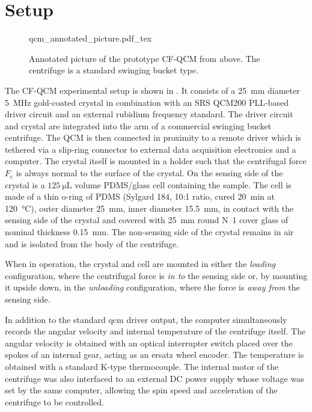 \section{Setup}
\begin{figure}[ht]
  \centering
  {qcm_annotated_picture.pdf_tex}
  \caption{Annotated picture of the prototype CF-QCM from above.  The
    centrifuge is a standard swinging bucket type.}
  \label{fig:cfqcmexpsetup}
\end{figure}

The CF-QCM experimental setup is shown in .  It
consists of a \SI{25}{\milli\meter} diameter \SI{5}{\mega\hertz} gold-coated
crystal in combination with an SRS QCM200 PLL-based driver circuit and an
external rubidium frequency standard.  The driver circuit and crystal are
integrated into the arm of a commercial swinging bucket centrifuge.  The QCM
is then connected in proximity to a remote driver which is tethered via
a slip-ring connector to external data acquisition electronics and a computer.
The crystal itself is mounted in a holder such that the centrifugal force
$F_\mathrm{c}$ is always normal to the surface of the crystal.  On the sensing
side of the crystal is a $\SI{125}{\micro\liter}$ volume PDMS/glass cell
containing the sample.  The cell is made of a thin o-ring of PDMS (Sylgard
184, 10:1 ratio, cured \SI{20}{\minute} at \SI{120}{\celsius}), outer diameter
\SI{25}{\milli\meter}, inner diameter \SI{15.5}{\milli\meter}, in contact with
the sensing side of the crystal and covered with \SI{25}{\milli\meter} round
N~1 cover glass of nominal thickness
\SI{0.15}{\milli\meter}.  The non-sensing side of the crystal remains in air
and is isolated from the body of the centrifuge.

When in operation, the crystal and cell are mounted in either the
\textit{loading} configuration, where the centrifugal force is \textit{in
  to} the sensing side or, by mounting it upside down, in the
\textit{unloading} configuration, where the force is \textit{away from} the
sensing side.

In addition to the standard \gls{qcm} driver output, the computer simultaneously
records the angular velocity and internal temperature of the centrifuge
itself.  The angular velocity is obtained with an optical interrupter
switch placed over the spokes of an internal gear, acting as an ersatz
wheel encoder.  The temperature is obtained with a standard K-type
thermocouple.  The internal motor of the centrifuge was also interfaced to
an external DC power supply whose voltage was set by the same
computer, allowing the spin speed and acceleration of the centrifuge to be
controlled.

